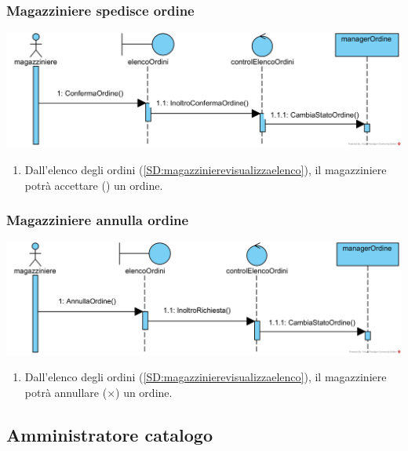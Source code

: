 \documentclass[12pt,a4paper]{article}
\begin{document}
\subsubsection{Magazziniere spedisce ordine}
\label{SD:magazzinierespedisce}
\begin{center}
\includegraphics[width=\textwidth]{SequenceDiagram/MagazziniereSpedisceOrdine}
\end{center}

\begin{enumerate}
\item Dall'elenco degli ordini (\ref{SD:magazzinierevisualizzaelenco}), il magazziniere potrà accettare (\checkmark) un ordine.
\end{enumerate}

\subsubsection{Magazziniere annulla ordine}
\label{SD:magazzinierespedisce}
\begin{center}
\includegraphics[width=\textwidth]{SequenceDiagram/MagazziniereAnnullaOrdine}
\end{center}

\begin{enumerate}
\item Dall'elenco degli ordini (\ref{SD:magazzinierevisualizzaelenco}), il magazziniere potrà annullare ($\times$) un ordine.
\end{enumerate}

\newpage

\subsection{Amministratore catalogo}
\end{document}

